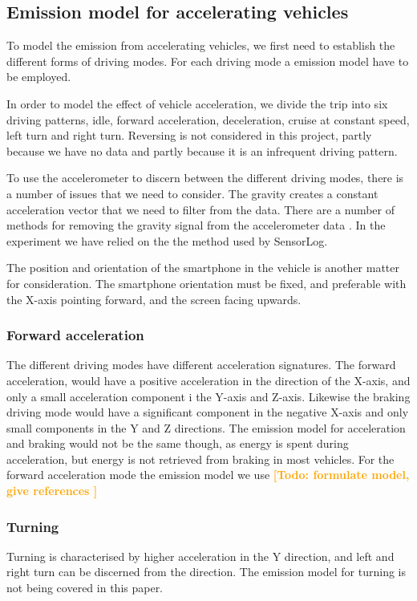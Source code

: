 \documentclass[conference]{IEEEtran}
\newcommand{\todo}[1]{\textsf{\textbf{\textcolor{Orange}{[Todo: #1]}}}}
\newcommand{\todo}[1]{}
\begin{document}
\subsection{Emission model for accelerating vehicles}

To model the emission from accelerating vehicles, we first need to establish the different forms of driving modes. For each driving mode a emission model have to be employed.

In order to model the effect of vehicle acceleration, we divide the trip into six driving patterns, idle, forward acceleration, deceleration, cruise at constant speed, left turn and right turn. Reversing is not considered in this project, partly because we have no data and partly because it is an infrequent driving pattern. 

To use the accelerometer to discern between the different driving modes, there is a number of issues that we need to consider. The gravity creates a constant acceleration vector that we need to filter from the data. There are a number of methods for removing the gravity signal from the accelerometer data \cite{bla}. In the experiment we have relied on the the method used by SensorLog.

The position and orientation of the smartphone in the vehicle is another matter for consideration. The smartphone orientation must be fixed, and preferable with the X-axis pointing forward, and the screen facing upwards.

\subsubsection{Forward acceleration}
The different driving modes have different acceleration signatures. The forward acceleration, would have a positive acceleration in the direction of the X-axis, and only a small acceleration component i the Y-axis and Z-axis. Likewise the braking driving mode would have a significant component in the negative X-axis and only small components in the Y and Z directions. The emission model for acceleration and braking would not be the same though, as energy is spent during acceleration, but energy is not retrieved from braking in most vehicles. For the forward acceleration mode the emission model we use \todo{formulate model, give references }

\subsubsection{Turning}
Turning is characterised by higher acceleration in the Y direction, and left and right turn can be discerned from the direction. The emission model for turning is not being covered in this paper.
\end{document}
